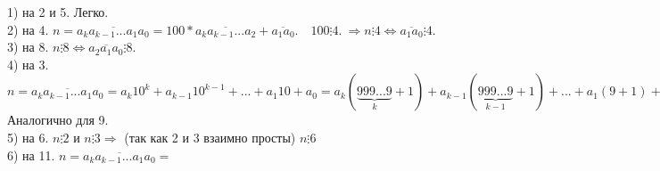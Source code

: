 \documentclass{article}
\begin{document}
  1) на 2 и 5. Легко.\\
  2) на 4. \( n = \overline{a_ka_{k-1}...a_1a_0} = 100 * \overline{a_ka_{k-1}...a_2} + \overline{a_1a_0}.\quad 100 \vdots 4.\ \Rightarrow n \vdots 4 \Leftrightarrow \overline{a_1a_0} \vdots 4 \).\\
  3) на 8. \( n \vdots 8 \Leftrightarrow \overline{a_2a_1a_0} \vdots 8 \).\\
  4) на 3. \( n = \overline{a_ka_{k-1}...a_1a_0} = a_k10^k + a_{k-1}10^{k-1} + ... + a_1 10 + a_0 = a_k(\underbrace{999...9}_k + 1) + a_{k-1}(\underbrace{999...9}_{k-1} + 1) + ... + a_1(9 + 1) + a_0 = (a_k\underbrace{999...9}_k + a_{k-1}\underbrace{999...9}_{k-1} + ... + a_1 9) + (a_k + a_{k-1} + ... + a_1 + a_0) \)\\
  Аналогично для 9.\\
  5) на 6. \( n \vdots 2 \) и \( n \vdots 3 \Rightarrow \) (так как 2 и 3 взаимно просты) \( n \vdots 6 \)\\
  6) на 11. \( n = \overline{a_ka_{k-1}...a_1a_0} = \)
\end{document}
